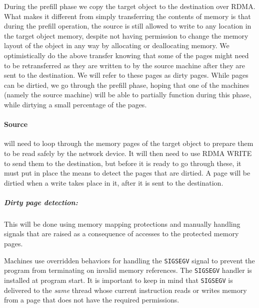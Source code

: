 During the prefill phase we copy the target object to the destination over RDMA.
What makes it different from simply transferring the contents of memory is that
during the prefill operation, the source is still allowed to write to
any location in the target object memory,
despite not having permission to change the memory layout of the object
in any way by allocating or deallocating memory. We optimistically do the above
transfer knowing that some of the pages might need to be retransferred as they
are written to by the source machine after they are sent to the destination.
We will refer to these pages as dirty pages. While pages can be
dirtied, we go through the prefill phase, hoping that one of the
machines (namely the source machine) will be able to partially function during
this phase, while dirtying a small percentage of the pages.


\paragraph{Source} will need to loop through the memory pages of the target
object to prepare them to be read safely by the network device. It will then
need to use RDMA WRITE to send them to the destination, but before it is ready
to go through these, it must put in place the means to detect the pages that
are dirtied. A page will be dirtied when a write takes place in it, after
it is sent to the destination.


\subparagraph{Dirty page detection:}
This will be done using memory mapping protections and manually
handling signals that
are raised as a consequence of accesses to the protected memory pages.

Machines use overridden behaviors for handling the \texttt{SIGSEGV} signal
to prevent the program from terminating on invalid memory references.
The \texttt{SIGSEGV} handler is installed at program start.
It is important to keep in mind that
\texttt{SIGSEGV} is delivered
to the \emph{same} thread whose current instruction reads or writes memory
from a page that does not have the required permissions.

